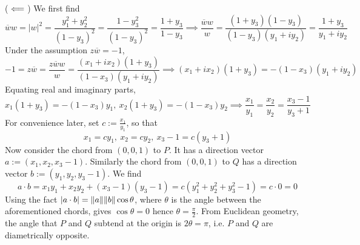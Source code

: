 \documentclass{article}
\renewcommand{\th}{\theta}
\newcommand{\imp}{\implies}
\newcommand{\impleft}{\reflectbox{$\implies$}}
\renewcommand{\bar}{\overline}
\begin{document}
($\impleft$) We first find
$$\bar ww = |w|^2
= \frac{y_1^2+y_2^2}{(1-y_3)^2}
= \frac{1-y_3^2}{(1-y_3)^2}
= \frac{1+y_3}{1-y_3}
\imp \frac{\bar ww}{w} = \frac{(1+y_3)(1-y_3)}{(1-y_3)(y_1+iy_2)}
= \frac{1+y_3}{y_1+iy_2}$$
Under the assumption $z\bar w=-1$,
$$-1 = z\bar w = \frac{z\bar ww}{w}
= \frac{(x_1+ix_2)(1+y_3)}{(1-x_3)(y_1+iy_2)}
\imp (x_1+ix_2)(1+y_3) = -(1-x_3)(y_1+iy_2)$$
Equating real and imaginary parts,
$$x_1(1+y_3) = -(1-x_3)y_1,~x_2(1+y_3) = -(1-x_3)y_2
\imp \frac{x_1}{y_1} = \frac{x_2}{y_2} = \frac{x_3-1}{y_3+1}$$
For convenience later, set $c:=\frac{x_1}{y_1}$, so that
$$x_1 = cy_1,~x_2 = cy_2,~x_3-1 = c(y_3+1)$$
Now consider the chord from $(0,0,1)$ to $P$. It has a direction vector $a:=(x_1,x_2,x_3-1)$. Similarly the chord from $(0,0,1)$ to $Q$ has a direction vector $b:=(y_1,y_2,y_3-1)$. We find
$$a\cdot b = x_1y_1 + x_2y_2 + (x_3-1)(y_3-1) = c(y_1^2+y_2^2+y_3^2-1) = c\cdot0 = 0$$
Using the fact $|a\cdot b|=\norm{a}\norm{b}\cos\th$, where $\th$ is the angle between the aforementioned chords, gives $\cos\th=0$ hence $\th=\frac\pi2$. From Euclidean geometry, the angle that $P$ and $Q$ subtend at the origin is $2\th=\pi$, i.e. $P$ and $Q$ are diametrically opposite.

	
\end{document}
